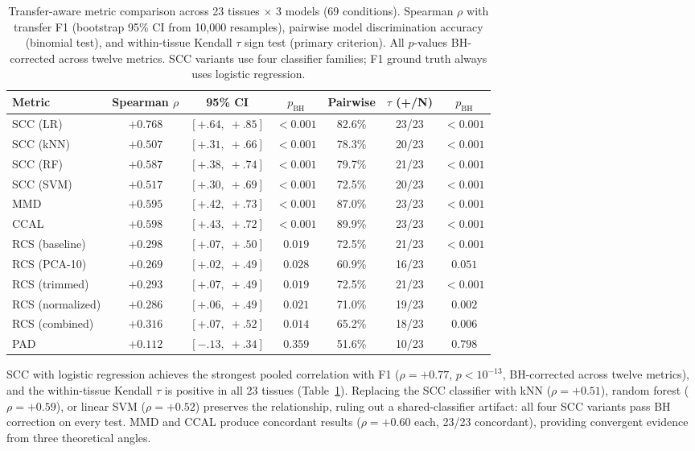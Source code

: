 \documentclass[11pt]{article}
\begin{document}
\begin{table}[t]
\centering
\caption{Transfer-aware metric comparison across 23 tissues
$\times$ 3 models (69 conditions). Spearman $\rho$ with transfer F1
(bootstrap 95\% CI from 10{,}000 resamples),
pairwise model discrimination accuracy (binomial test), and
within-tissue Kendall $\tau$ sign test (primary criterion). All
$p$-values BH-corrected across twelve metrics. SCC variants use
four classifier families; F1 ground truth always uses logistic
regression.}
\label{tab:scc}
\small
\begin{tabular}{@{}lcccccc@{}}
\toprule
Metric & Spearman $\rho$ & 95\% CI & $p_{\text{BH}}$ & Pairwise & $\tau$ (+/N) & $p_{\text{BH}}$ \\
\midrule
SCC (LR)         & $+0.768$ & $[+.64,\;+.85]$ & $<0.001$ & 82.6\% & 23/23 & $<0.001$ \\
SCC (kNN)        & $+0.507$ & $[+.31,\;+.66]$ & $<0.001$ & 78.3\% & 20/23 & $<0.001$ \\
SCC (RF)         & $+0.587$ & $[+.38,\;+.74]$ & $<0.001$ & 79.7\% & 21/23 & $<0.001$ \\
SCC (SVM)        & $+0.517$ & $[+.30,\;+.69]$ & $<0.001$ & 72.5\% & 20/23 & $<0.001$ \\
\midrule
MMD              & $+0.595$ & $[+.42,\;+.73]$ & $<0.001$ & 87.0\% & 23/23 & $<0.001$ \\
CCAL             & $+0.598$ & $[+.43,\;+.72]$ & $<0.001$ & 89.9\% & 23/23 & $<0.001$ \\
\midrule
RCS (baseline)   & $+0.298$ & $[+.07,\;+.50]$ & $0.019$  & 72.5\% & 21/23 & $<0.001$ \\
RCS (PCA-10)     & $+0.269$ & $[+.02,\;+.49]$ & $0.028$  & 60.9\% & 16/23 & $0.051$ \\
RCS (trimmed)    & $+0.293$ & $[+.07,\;+.49]$ & $0.019$  & 72.5\% & 21/23 & $<0.001$ \\
RCS (normalized) & $+0.286$ & $[+.06,\;+.49]$ & $0.021$  & 71.0\% & 19/23 & $0.002$ \\
RCS (combined)   & $+0.316$ & $[+.07,\;+.52]$ & $0.014$  & 65.2\% & 18/23 & $0.006$ \\
\midrule
PAD              & $+0.112$ & $[-.13,\;+.34]$ & $0.359$  & 51.6\% & 10/23 & $0.798$ \\
\bottomrule
\end{tabular}
\end{table}

SCC with logistic regression achieves the strongest pooled correlation
with F1 ($\rho = +0.77$, $p < 10^{-13}$, BH-corrected across twelve
metrics), and the within-tissue Kendall $\tau$ is positive in all 23
tissues (Table~\ref{tab:scc}). Replacing the SCC classifier with
kNN ($\rho = +0.51$), random forest ($\rho = +0.59$), or linear SVM
($\rho = +0.52$) preserves the relationship, ruling out a shared-classifier
artifact: all four SCC variants pass BH correction on every test.
MMD and CCAL produce concordant results ($\rho = +0.60$ each, 23/23
concordant), providing convergent evidence from three theoretical angles.
\end{document}

